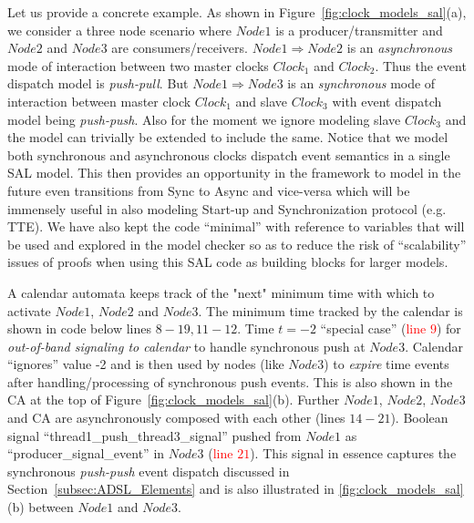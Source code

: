 
Let us provide a concrete example. As shown in
Figure~\ref{fig:clock_models_sal}(a), we consider a three node scenario where
$Node1$ is a producer/transmitter and $Node2$ and $Node3$ are
consumers/receivers. $Node1 \Longrightarrow Node 2$ is an \emph{asynchronous}
mode of interaction between two master clocks $Clock_1$ and $Clock_2$. Thus the
event dispatch model is \emph{push-pull}. But $Node1 \Longrightarrow Node 3$ is
an \emph{synchronous} mode of interaction between master clock $Clock_1$ and
slave $Clock_3$ with event dispatch model being \emph{push-push}. Also for the
moment we ignore modeling slave $Clock_3$ and the model can trivially be
extended to include the same. Notice that we model both synchronous and
asynchronous clocks dispatch event semantics in a single SAL model. This then
provides an opportunity in the framework to model in the future even transitions
from Sync to Async and vice-versa which will be immensely useful in also
modeling Start-up and Synchronization protocol (e.g. TTE). We
have also kept the code “minimal” with reference to variables that will be used
and explored in the model checker so as to reduce the risk of “scalability”
issues of proofs when using this SAL code as building blocks for larger models.

A calendar automata keeps track of the "next" minimum time with which to
activate $Node1$, $Node2$ and $Node3$. The
minimum time tracked by the calendar is shown in code below lines $8-19,
11-12$. Time $t = -2$ “special case” (\textcolor{red}{line $9$}) for
\emph{out-of-band signaling to calendar} to handle synchronous push at
$Node3$. Calendar “ignores” value -2 and is then used by nodes (like $Node3$) to
\emph{expire} time events after handling/processing of synchronous push
events. This is also shown in the CA at the top of
Figure~\ref{fig:clock_models_sal}(b). Further $Node1$, $Node2$, $Node3$ and CA
are asynchronously composed with each other (lines $14-21$). Boolean signal
“thread1\_push\_thread3\_signal” pushed from $Node1$ as
“producer\_signal\_event” in $Node3$ (\textcolor{red}{line $21$}).  This signal
in essence captures the synchronous \emph{push-push} event dispatch discussed in
Section~\ref{subsec:ADSL_Elements} and is also illustrated in
\ref{fig:clock_models_sal}(b) between $Node1$ and $Node3$.

